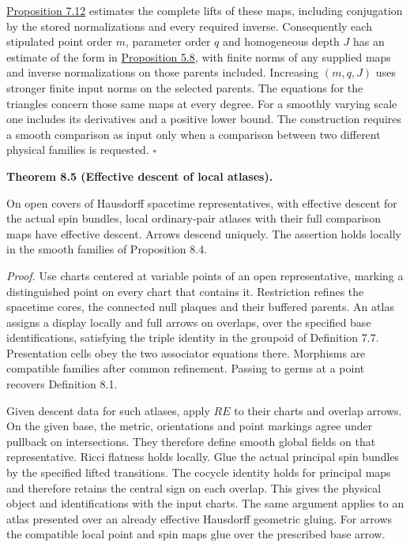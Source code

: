 \documentclass[
  english,
  11pt,
  reqno]{amsart}
\makeatletter
\newcommand{\pandocstatementheading}[1]{%
  \par\if@nobreak\else
    \addpenalty{\@beginparpenalty}%
    \addvspace{.5\baselineskip plus .2\baselineskip minus .2\baselineskip}%
  \fi
  {\normalfont\bfseries #1\par}%
  \nobreak\@afterindenttrue\@afterheading
}
\makeatother
\begin{document}
\hyperref[prop:online-full-comparison-finite-families]{Proposition 7.12}
estimates the complete lifts of these maps, including conjugation by the
stored normalizations and every required inverse. Consequently each
stipulated point order \(m\), parameter order \(q\) and homogeneous
depth \(J\) has an estimate of the form in
\hyperref[prop:submission-coverage-family-estimates]{Proposition 5.8},
with finite norms of any supplied maps and inverse normalizations on
those parents included. Increasing \((m,q,J)\) uses stronger finite
input norms on the selected parents. The equations for the triangles
concern those same maps at every degree. For a smoothly varying scale
one includes its derivatives and a positive lower bound. The
construction requires a smooth comparison as input only when a
comparison between two different physical families is requested.
\hfill\(\square\)

\pandocstatementheading{\leavevmode{}\label{thm:local-display-atlas-descent}Theorem 8.5 (Effective descent of local atlases).}

On open covers of Hausdorff spacetime representatives, with effective
descent for the actual spin bundles, local ordinary-pair atlases with
their full comparison maps have effective descent. Arrows descend
uniquely. The assertion holds locally in the smooth families of
Proposition 8.4.

\emph{Proof.} Use charts centered at variable points of an open
representative, marking a distinguished point on every chart that
contains it. Restriction refines the spacetime cores, the connected null
plaques and their buffered parents. An atlas assigns a display locally
and full arrows on overlaps, over the specified base identifications,
satisfying the triple identity in the groupoid of Definition 7.7.
Presentation cells obey the two associator equations there. Morphisms
are compatible families after common refinement. Passing to germs at a
point recovers Definition 8.1.

Given descent data for such atlases, apply \(R E\) to their charts and
overlap arrows. On the given base, the metric, orientations and point
markings agree under pullback on intersections. They therefore define
smooth global fields on that representative. Ricci flatness holds
locally. Glue the actual principal spin bundles by the specified lifted
transitions. The cocycle identity holds for principal maps and therefore
retains the central sign on each overlap. This gives the physical object
and identifications with the input charts. The same argument applies to
an atlas presented over an already effective Hausdorff geometric gluing.
For arrows the compatible local point and spin maps glue over the
prescribed base arrow.
\end{document}
